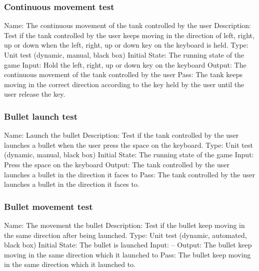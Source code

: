 \documentclass{article}
\begin{document}
\subsubsection{Continuous movement test}
Name:  The continuous movement of the tank controlled by the user\newline
Description: Test if the tank controlled by the user keeps moving in the direction of left, right, up or down when the left, right, up or down key on the keyboard is held. \newline
Type: Unit test (dynamic, manual, black box) \newline
Initial State:  The running state of the game \newline
Input: Hold the left, right, up or down key on the keyboard\newline
Output: The continuous movement of the tank controlled by the user\newline
Pass:  The tank keeps moving in the correct direction according to the key held by the user until the user release the key. \newline

\subsubsection{Bullet launch test}
Name:  Launch the bullet\newline
Description: Test if the tank controlled by the user launches a bullet when the user press the space on the keyboard. \newline
Type: Unit test (dynamic, manual, black box) \newline
Initial State: The running state of the game \newline
Input: Press the space on the keyboard\newline
Output: The tank controlled by the user launches a bullet in the direction it faces to \newline
Pass: The tank controlled by the user launches a bullet in the direction it faces to. \newline

\subsubsection{Bullet movement test}
Name:  The movement the bullet\newline
Description: Test if the bullet keep moving in the same direction after being launched. \newline
Type: Unit test (dynamic, automated, black box) \newline
Initial State:  The bullet is launched \newline
Input: --\newline
Output: The bullet keep moving in the same direction which it launched to\newline
Pass:  The bullet keep moving in the same direction which it launched to. \newline
\end{document}
